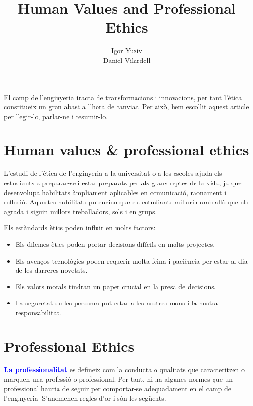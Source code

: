 \documentclass[12pt, a4papre]{article}
\author{Igor Yuziv\\
	   Daniel Vilardell}
\title{\textbf{Human Values and Professional Ethics}}
\date{}
\begin{document}
	\maketitle
	
	El camp de l’enginyeria tracta de transformacions i innovacions, per tant l’ètica constitueix un gran abast a l’hora de canviar. Per això, hem escollit aquest article per llegir-lo, parlar-ne i resumir-lo.	
	\section{Human values \& professional ethics}
	
	L’estudi de l’ètica de l’enginyeria a la universitat o a les escoles ajuda els estudiants a preparar-se i estar preparats per als grans reptes de la vida, ja que desenvolupa habilitats àmpliament aplicables en comunicació, raonament i reflexió. Aquestes habilitats potencien que els estudiants millorin amb allò que els agrada i siguin millors treballadors, sols i en grups.
	
	
	Els estàndards ètics poden influir en molts factors:
	\begin{itemize}
		\item Els dilemes ètics poden portar decisions difícils en molts projectes.
		\item Els avenços tecnològics poden requerir molta feina i paciència per estar al dia de les darreres novetats.			\item	Els valors morals tindran un paper crucial en la presa de decisions.
		\item La seguretat de les persones pot estar a les nostres mans i la nostra responsabilitat.
	\end{itemize}
	
	\section{Professional Ethics}
	
	\textbf{\textcolor{blue}{La professionalitat}} es defineix com la conducta o qualitats que caracteritzen o marquen una professió o professional. Per tant, hi ha algunes normes que un professional hauria de seguir per comportar-se adequadament en el camp de l'enginyeria. S’anomenen regles d’or i són les següents.
\end{document}
